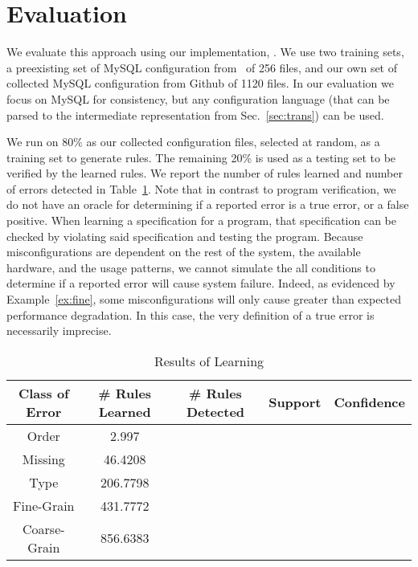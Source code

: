 
\section{Evaluation}

We evaluate this approach using our implementation, \app.
We use two training sets, a preexisting set of MySQL configuration from~\cite{xu15systems} of 256 files,
 and our own set of collected MySQL configuration from Github of 1120 files.
In our evaluation we focus on MySQL for consistency, but any configuration language (that can be parsed to the intermediate representation from Sec.~\ref{sec:trans}) can be used.


We run \app on 80\% as our collected configuration files, selected at random, as a training set to generate rules.
The remaining 20\% is used as a testing set to be verified by the learned rules.
We report the number of rules learned and number of errors detected in Table~\ref{table:learning}.
Note that in contrast to program verification, we do not have an oracle for determining if a reported error is a true error, or a false positive.
When learning a specification for a program, that specification can be checked by violating said specification and testing the program.
Because misconfigurations are dependent on the rest of the system, the available hardware, and the usage patterns, we cannot simulate the all conditions to determine if a reported error will cause system failure.
Indeed, as evidenced by Example~\ref{ex:fine}, some misconfigurations will only cause greater than expected performance degradation.
In this case, the very definition of a true error is necessarily imprecise.

\begin{table}[h]
\centering
\caption{Results of Learning}
\label{table:learning}
\setlength{\tabcolsep}{0.5em}
\begin{tabular}{|c|c|c|c|c|}
\hline
{\bf Class of Error } & {\bf \# Rules Learned} & {\bf \# Rules Detected} & {\bf Support} & {\bf Confidence}\\ 
\hline
\hline
Order        & 2.997     & &  & \\ 
Missing      & 46.4208   & &  & \\ 
Type         & 206.7798  & &  & \\ 
Fine-Grain   & 431.7772  & &  & \\ 
Coarse-Grain & 856.6383  & &  & \\ 
\hline
\end{tabular}
\end{table}

